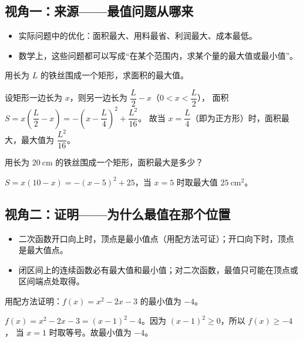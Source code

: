 \begin{explore}
\subsection{视角一：来源——最值问题从哪来}

\begin{itemize}
  \item 实际问题中的优化：面积最大、用料最省、利润最大、成本最低。
  \item 数学上，这些问题都可以写成“在某个范围内，求某个量的最大值或最小值”。
\end{itemize}

\begin{example}
用长为 $L$ 的铁丝围成一个矩形，求面积的最大值。
\end{example}
\begin{solution}
设矩形一边长为 $x$，则另一边长为 $\dfrac{L}{2}-x$（$0<x<\dfrac{L}{2}$），
面积 $S=x\left(\dfrac{L}{2}-x\right)=-\left(x-\dfrac{L}{4}\right)^2+\dfrac{L^2}{16}$。
故当 $x=\dfrac{L}{4}$（即为正方形）时，面积最大，最大值为 $\dfrac{L^2}{16}$。
\end{solution}

\begin{problem}
用长为 $20\ \mathrm{cm}$ 的铁丝围成一个矩形，面积最大是多少？
\end{problem}
\begin{solution}
$S=x(10-x)=-(x-5)^2+25$，当 $x=5$ 时取最大值 $25\ \mathrm{cm^2}$。
\end{solution}

\subsection{视角二：证明——为什么最值在那个位置}

\begin{itemize}
  \item 二次函数开口向上时，顶点是最小值点（用配方法可证）；开口向下时，顶点是最大值点。
  \item 闭区间上的连续函数必有最大值和最小值；对二次函数，最值只可能在顶点或区间端点处取得。
\end{itemize}

\begin{example}
用配方法证明：$f(x)=x^2-2x-3$ 的最小值为 $-4$。
\end{example}
\begin{solution}
$f(x)=x^2-2x-3=(x-1)^2-4$。因为 $(x-1)^2\geq0$，所以 $f(x)\geq-4$，
当 $x=1$ 时取等号。故最小值为 $-4$。
\end{solution}


\end{explore}
